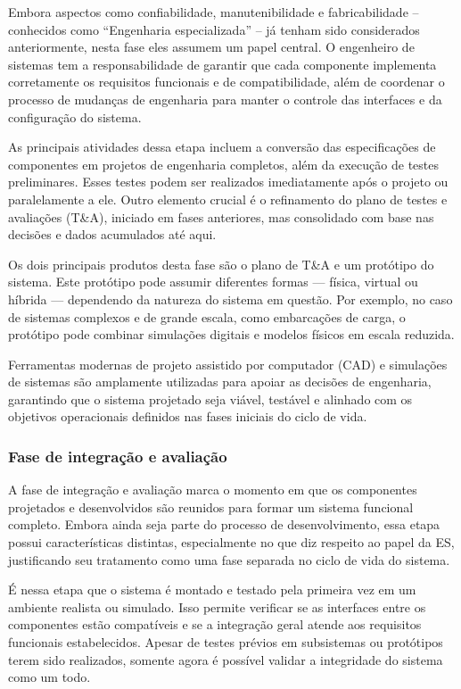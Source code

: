 	Embora aspectos como confiabilidade, manutenibilidade e fabricabilidade – conhecidos como ``Engenharia especializada'' – já tenham sido considerados anteriormente, 
	nesta fase eles assumem um papel central. O engenheiro de sistemas tem a responsabilidade de garantir que cada componente implementa corretamente os requisitos 
	funcionais e de compatibilidade, além de coordenar o processo de mudanças de engenharia para manter o controle das interfaces e da configuração do sistema.

	As principais atividades dessa etapa incluem a conversão das especificações de componentes em projetos de engenharia completos, além da execução de testes 
	preliminares. Esses testes podem ser realizados imediatamente após o projeto ou paralelamente a ele. Outro elemento crucial é o refinamento do plano de testes e 
	avaliações (T\&A), iniciado em fases anteriores, mas consolidado com base nas decisões e dados acumulados até aqui.

	Os dois principais produtos desta fase são o plano de T\&A e um protótipo do sistema. Este protótipo pode assumir diferentes formas — física, virtual ou híbrida — 
	dependendo da natureza do sistema em questão. Por exemplo, no caso de sistemas complexos e de grande escala, como embarcações de carga, o protótipo pode combinar
	simulações digitais e modelos físicos em escala reduzida.

	Ferramentas modernas de projeto assistido por computador (CAD) e simulações de sistemas são amplamente utilizadas para apoiar as decisões de engenharia, 
	garantindo que o sistema projetado seja viável, testável e alinhado com os objetivos operacionais definidos nas fases iniciais do ciclo de vida.

	\subsubsection*{Fase de integração e avaliação}
	A fase de integração e avaliação marca o momento em que os componentes projetados e desenvolvidos são reunidos para formar um sistema funcional completo. 
	Embora ainda seja parte do processo de desenvolvimento, essa etapa possui características distintas, especialmente no que diz respeito ao papel da ES, 
	justificando seu tratamento como uma fase separada no ciclo de vida do sistema.

	É nessa etapa que o sistema é montado e testado pela primeira vez em um ambiente realista ou simulado. Isso permite verificar se as interfaces entre os 
	componentes estão compatíveis e se a integração geral atende aos requisitos funcionais estabelecidos. Apesar de testes prévios em subsistemas ou protótipos 
	terem sido realizados, somente agora é possível validar a integridade do sistema como um todo.

